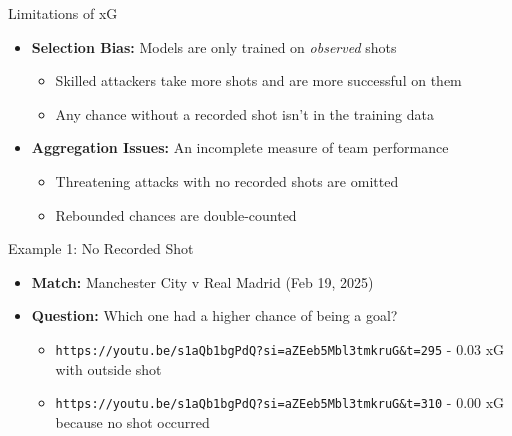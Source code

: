 \documentclass{beamer}
\begin{document}
\begin{frame}{Limitations of xG}
\begin{itemize}
\item \textbf{Selection Bias:} Models are only trained on \emph{observed} shots
  \begin{itemize}
  \item Skilled attackers take more shots and are more successful on them
  \item Any chance without a recorded shot isn't in the training data
  \end{itemize}
\item \textbf{Aggregation Issues:} An incomplete measure of team performance
\begin{itemize}
  \item Threatening attacks with no recorded shots are omitted
  \item Rebounded chances are double-counted
\end{itemize}
\end{itemize}
\end{frame}

\begin{frame}[fragile]{Example 1: No Recorded Shot}
\begin{itemize}
\item \textbf{Match:} Manchester City v Real Madrid (Feb 19, 2025)
\item \textbf{Question:} Which one had a higher chance of being a goal?
  \begin{itemize}
  \item \verb|https://youtu.be/s1aQb1bgPdQ?si=aZEeb5Mbl3tmkruG&t=295| - 0.03 xG with outside shot
  \item \verb|https://youtu.be/s1aQb1bgPdQ?si=aZEeb5Mbl3tmkruG&t=310| - 0.00 xG because no shot occurred
  \end{itemize}
\end{itemize}
\end{frame}
\end{document}
